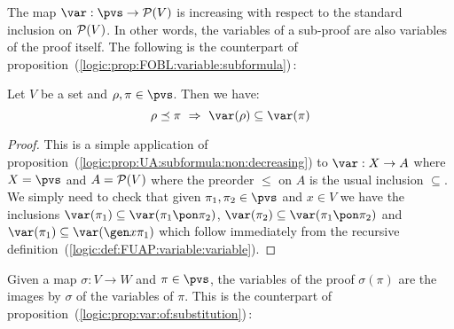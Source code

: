 The map $\var:\pvs\to{\cal P}(V)$ is increasing with respect to the
standard inclusion on ${\cal P}(V)$. In other words, the variables
of a sub-proof are also variables of the proof itself. The following
is the counterpart of
proposition~(\ref{logic:prop:FOBL:variable:subformula})\,:
\begin{prop}\label{logic:prop:FUAP:variable:subformula}
Let $V$ be a set and $\rho,\pi\in\pvs$. Then we have:
    \[
    \rho\preceq\pi\ \Rightarrow\ \var(\rho)\subseteq\var(\pi)
    \]
\end{prop}
\begin{proof}
This is a simple application of
proposition~(\ref{logic:prop:UA:subformula:non:decreasing}) to
$\var:X\to A$ where $X=\pvs$ and $A={\cal P}(V)$ where the preorder
$\leq$ on $A$ is the usual inclusion $\subseteq$. We simply need to
check that given $\pi_{1},\pi_{2}\in\pvs$ and $x\in V$ we have the
inclusions $\var(\pi_{1})\subseteq\var(\pi_{1}\pon\pi_{2})$,
$\var(\pi_{2})\subseteq\var(\pi_{1}\pon\pi_{2})$ and
$\var(\pi_{1})\subseteq\var(\gen x\pi_{1})$ which follow immediately
from the recursive
definition~(\ref{logic:def:FUAP:variable:variable}).
\end{proof}

Given a map $\sigma:V\to W$ and $\pi\in\pvs$, the variables of the
proof $\sigma(\pi)$ are the images by $\sigma$ of the variables of
$\pi$. This is the counterpart of
proposition~(\ref{logic:prop:var:of:substitution})\,:

